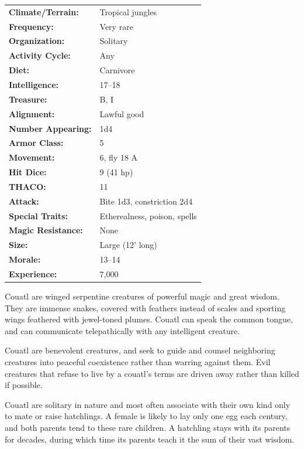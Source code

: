 \begin{multicols}{2}
\begin{minipage}{\columnwidth}
\noindent \begin{tabular}{p{}p{}}
\textbf{Climate/Terrain:}	& Tropical jungles \\
\textbf{Frequency:} 		& Very rare \\
\textbf{Organization:} 		& Solitary \\
\textbf{Activity Cycle:} 	& Any \\
\textbf{Diet:} 				& Carnivore \\
\textbf{Intelligence:} 		& 17--18 \\
\textbf{Treasure:} 			& B, I \\
\textbf{Alignment:} 		& Lawful good \\
\hline
\textbf{Number Appearing:} 	& 1d4 \\
\textbf{Armor Class:} 		& 5 \\
\textbf{Movement:} 			& 6, fly 18 A \\
\textbf{Hit Dice:} 			& 9 (41 hp) \\
\textbf{THACO:} 			& 11 \\
\textbf{Attack:} 			& Bite 1d3, constriction 2d4 \\
\textbf{Special Traits:} & Etherealness, poison, spells \\
\textbf{Magic Resistance:} 	& None \\
\textbf{Size:} 				& Large (12' long) \\
\textbf{Morale:} 			& 13--14 \\
\textbf{Experience:} 		& 7,000 \\ %
\end{tabular}

\end{minipage}

Couatl are winged serpentine creatures of powerful magic and great wisdom. They are immense snakes, covered with feathers instead of scales and sporting wings feathered with jewel-toned plumes. Couatl can speak the common tongue, and can communicate telepathically with any intelligent creature.

Couatl are benevolent creatures, and seek to guide and counsel neighboring creatures into peaceful coexistence rather than warring against them. Evil creatures that refuse to live by a couatl's terms are driven away rather than killed if possible.

Couatl are solitary in nature and most often associate with their own kind only to mate or raise hatchlings. A female is likely to lay only one egg each century, and both parents tend to these rare children. A hatchling stays with its parents for decades, during which time its parents teach it the sum of their vast wisdom.


\end{multicols}
